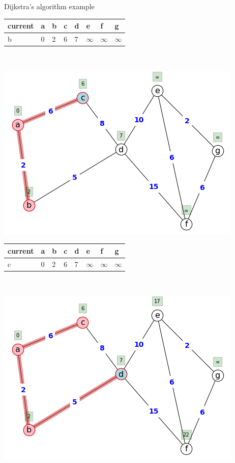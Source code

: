 \begin{example}{Dijkstra's algorithm example}{}
\begin{minipage}{0.5\textwidth}
         \begin{tabular}{|l|l|l|l|l|l|l|l|}
    \hline
        current & a & b & c & d & e & f & g \\ \hline
        b & 0 & 2 & 6 & 7 & $\infty$ & $\infty$ & $\infty$ \\ \hline
    \end{tabular}
     \end{minipage}\\
\begin{minipage}{0.5\textwidth}
\includegraphics[scale = 0.5]{graph-theory-graphics/dijkstra3.png}
\end{minipage}
\begin{minipage}{0.5\textwidth}
          \begin{tabular}{|l|l|l|l|l|l|l|l|}
    \hline
        current & a & b & c & d & e & f & g \\ \hline
        c & 0 & 2 & 6 & 7 & $\infty$ & $\infty$ & $\infty$  \\ \hline
    \end{tabular}
     \end{minipage}\\
\begin{minipage}{0.5\textwidth}
\includegraphics[scale = 0.5]{graph-theory-graphics/dijkstra4.png} 

\end{minipage}
\end{example}
